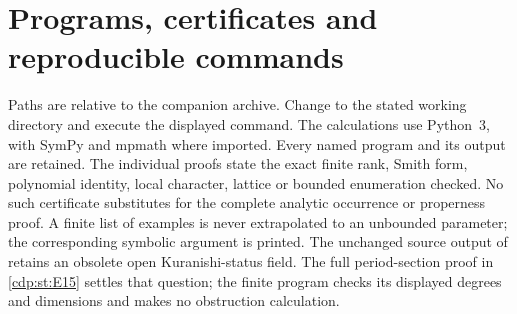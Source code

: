 \section{Programs, certificates and reproducible commands}\label{app:II:programs}
Paths are relative to the companion archive. Change to the stated working
directory and execute the displayed command. The calculations use Python~3,
with SymPy and mpmath where imported. Every named program and its output are
retained. The individual proofs state the exact finite rank, Smith form,
polynomial identity, local character, lattice or bounded enumeration checked.
No such certificate substitutes for the complete analytic occurrence or
properness proof. A finite list of examples is never extrapolated to an
unbounded parameter; the corresponding symbolic argument is printed.
The unchanged source output of  retains an obsolete open
Kuranishi-status field. The full period-section proof in
\cref{cdp:st:E15} settles that question; the finite program checks its
displayed degrees and dimensions and makes no obstruction calculation.

